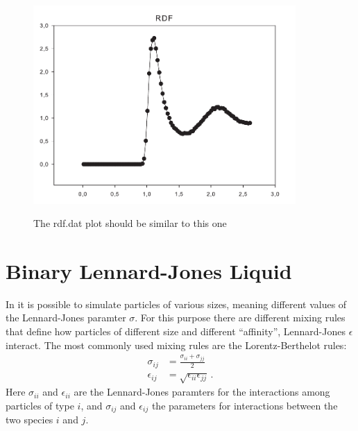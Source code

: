 \documentclass[
paper=a4,                       %
fontsize=11pt,                  %
twoside,                        %
footsepline,                    %
headsepline,                    %
headinclude=false,              %
footinclude=false,              %
pagesize,                       %
]{scrartcl}
\newtheorem{task}{Task}
\begin{document}
\begin{figure}[ht]
\begin{center}
\includegraphics[width=10cm]{figures/rdf}
\label{fig:rdf}
\caption{The rdf.dat plot should be similar to this one}
\end{center}
\end{figure}


\section{Binary Lennard-Jones Liquid}

In \es{} it is possible to simulate particles of various sizes, meaning different
values of the Lennard-Jones paramter $\sigma$. For this purpose there are different mixing
rules that define how particles of different size and different ``affinity'', Lennard-Jones $\epsilon$ interact. The most commonly used mixing rules are the
Lorentz-Berthelot rules:
\begin{align}
	\sigma_{ij}		& = \frac{\sigma_{ii} + \sigma_{jj}}{2} \\
	\epsilon_{ij}	& = \sqrt{\epsilon_{ii} \epsilon_{jj}} \,.
\end{align}
Here $\sigma_{ii}$ and $\epsilon_{ii}$ are the Lennard-Jones paramters for the
interactions among particles of type $i$, and $\sigma_{ij}$ and
$\epsilon_{ij}$ the parameters for interactions between the two species $i$ and $j$.

\vspace{1cm}\vspace{1cm}
\end{document}
